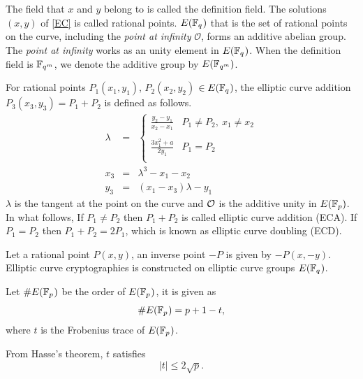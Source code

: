 The field that $x$ and $y$ belong to is called the definition field. 
The solutions $(x,y)$ of \eqref{EC} is called rational points.
$E({\mathbb{F}}_{q^{}})$ that is the set of rational points on the curve, including the {\it point at infinity} $\mathcal{O}$, forms an additive abelian group. 
The {\it point at infinity} works as an unity element in $E({\mathbb{F}}_{q^{}})$.
When the definition field is ${\mathbb{F}}_{q^{m}}$, we denote the additive group by $E({\mathbb{F}}_{q^{m}})$.

For rational points $P_1(x_1,y_1)$, $P_2(x_2,y_2)$ $\in E({\mathbb{F}}_{q^{}})$, the elliptic curve addition $P_3(x_3,y_3)=P_1+P_2$ is defined as follows.
\begin{eqnarray*}
	\lambda &=& \left\{ \begin{array}{ll}
		{\displaystyle \frac{y_2-y_1}{x_2-x_1}} & P_1\neq P_2,\ x_1\neq x_2 \\
		& \\
		{\displaystyle \frac{3x_1^2+a}{2y_1}} & P_1=P_2 \\
		
	\end{array} \right.\\
	x_3 &=& \lambda^3-x_1-x_2\\
	y_3 &=& (x_1-x_3)\lambda-y_1
\end{eqnarray*} 
$\lambda$ is the tangent at the point on the curve and $\cal O$ is the additive unity in $E({\mathbb{F}}_{p})$.
In what follows, If $P_1 \neq P_2$ then $P_1+P_2$ is called elliptic curve addition (ECA). 
If $P_1=P_2$ then $P_1+P_2=2P_1$, which is known as elliptic curve doubling (ECD). 

Let a rational point $P(x,y)$, an inverse point $-P$ is given by $-P(x, -y)$. 
Elliptic curve cryptographies is constructed on elliptic curve groups $E({\mathbb{F}}_{q^{}})$.



Let $\#E({\mathbb{F}}_{p^{}})$ be the order of $E({\mathbb{F}}_{p^{}})$, it is given as
\begin{equation}
\#E(\F{p}{})=p+1-t, %
\end{equation}
where $t$ is the Frobenius trace of $E({\mathbb{F}}_{p^{}})$. 

From Hasse's theorem, $t$ satisfies
\begin{equation}
|t| \leq 2\sqrt{p}.
\end{equation}

